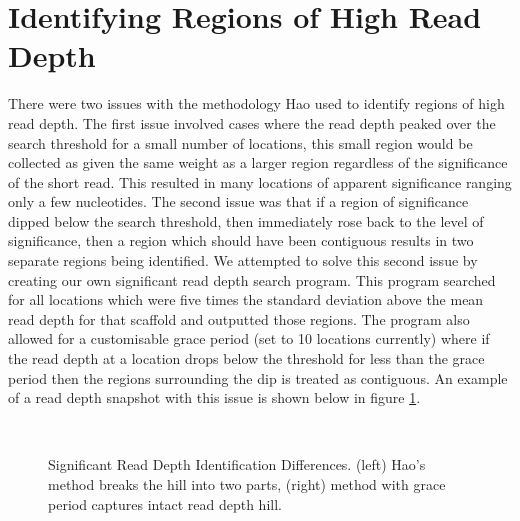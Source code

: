 \documentclass[12pt]{article}
\begin{document}
\section{Identifying Regions of High Read Depth}
\vspace{-0.5cm}
	There were two issues with the methodology Hao used to identify regions of high read depth. The first issue involved cases where the read depth peaked over the search threshold for a small number of locations, this small region would be collected as given the same weight as a larger region regardless of the significance of the short read. This resulted in many locations of apparent significance ranging only a few nucleotides. The second issue was that if a region of significance dipped below the search threshold, then immediately rose back to the level of significance, then a region which should have been contiguous results in two separate regions being identified. We attempted to solve this second issue by creating our own significant read depth search program. This program searched for all locations which were five times the standard deviation above the mean read depth for that scaffold and outputted those regions. The program also allowed for a customisable grace period (set to 10 locations currently) where if the read depth at a location drops below the threshold for less than the grace period then the regions surrounding the dip is treated as contiguous. An example of a read depth snapshot with this issue is shown below in figure \ref{rdsnpstdevgrace}.
\begin{figure}[H]
	\begin{centering}
		\\
		\begin{singlespace}
			\vspace{-0.5cm}
			\caption[Significant Read Depth Identification Differences.]{Significant Read Depth Identification Differences. (left) Hao's method breaks the hill into two parts, (right) method with grace period captures intact read depth hill.}\label{rdsnpstdevgrace}
		\end{singlespace}
	\end{centering}
\end{figure}
\end{document}
